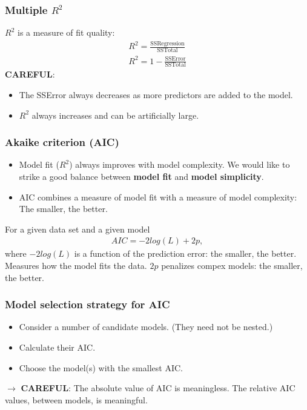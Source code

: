 \documentclass{beamer}\usepackage[]{graphicx}\usepackage[]{color}
\begin{document}
{{{
\begin{frame}[fragile]
\frametitle{Multiple $R^2$}
$R^2$ is a measure of fit quality:
\begin{eqnarray}
R^2 = \frac{\text{SSRegression}}{\text{SSTotal}} \\
R^2 = 1 - \frac{\text{SSError}}{\text{SSTotal}}
\nonumber
\end{eqnarray}
\textbf{CAREFUL}:
\begin{itemize}
\item The SSError always decreases as more predictors are added to the model.
\item $R^2$ always increases and can be artificially large.
\end{itemize}
\end{frame}


\usebackgroundtemplate{}
\begin{frame}[fragile]
\frametitle{Akaike criterion (AIC)}
\begin{itemize}
\item Model fit ($R^2$) always improves with model complexity. We would like to
strike a good balance between \textbf{model fit} and \textbf{model simplicity}.
\item AIC combines a measure of model fit with a measure of model complexity:
The smaller, the better.
\end{itemize}
For a given data set and a given model
\begin{eqnarray}
AIC = -2 log(L) + 2p, \nonumber
\end{eqnarray}
where $-2 log(L)$ is a function of the prediction error: the smaller, the better.
Measures how the model fits the data. $2p$ penalizes compex models: the smaller,
the better.
\end{frame}


\usebackgroundtemplate{}
\begin{frame}[fragile]
\frametitle{Model selection strategy for AIC}
\begin{itemize}
\item Consider a number of candidate models. \newline
(They need not be nested.)
\item Calculate their AIC.
\item Choose the model(s) with the smallest AIC.
\end{itemize}
$\rightarrow$ \textbf{CAREFUL}: The absolute value of AIC is meaningless. The
relative AIC values, between models, is meaningful.
\end{frame}

}}}
\end{document}
